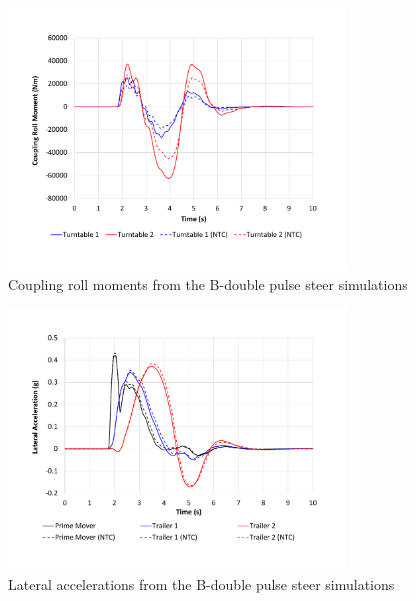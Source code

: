     \begin{figure}[H]
        \centering
        \includegraphics[width=0.8\textwidth]{fig/ntc-b-double_psk}
        \caption{Coupling roll moments from the B-double pulse steer simulations}
        \label{figure:ntc-b-double_psk}
    \end{figure}

    \begin{figure}[H]
        \centering
        \includegraphics[width=0.8\textwidth]{fig/ntc-b-double_psl}
        \caption{Lateral accelerations from the B-double pulse steer simulations}
        \label{figure:ntc-b-double_psl}
    \end{figure}

